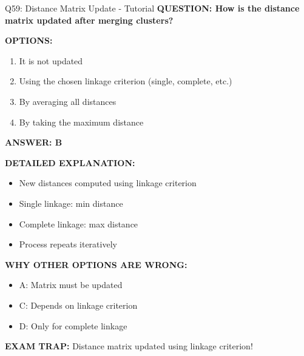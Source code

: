 \documentclass[8pt]{beamer}
\begin{document}
	\begin{frame}{Q59: Distance Matrix Update - Tutorial}
		\fontsize{6.5}{7.5}\selectfont
		\textbf{QUESTION: How is the distance matrix updated after merging clusters?}
		
		\vspace{0.1cm}
		\textbf{OPTIONS:}
		\begin{enumerate}
			\item It is not updated
			\item Using the chosen linkage criterion (single, complete, etc.)
			\item By averaging all distances
			\item By taking the maximum distance
		\end{enumerate}
		
		\vspace{0.1cm}
		\textcolor{myblue}{\textbf{ANSWER: B}}
		
		\vspace{0.1cm}
		\textbf{DETAILED EXPLANATION:}
		\begin{itemize}
			\item New distances computed using linkage criterion
			\item Single linkage: min distance
			\item Complete linkage: max distance
			\item Process repeats iteratively
		\end{itemize}
		
		\vspace{0.1cm}
		\textcolor{myred}{\textbf{WHY OTHER OPTIONS ARE WRONG:}}
		\begin{itemize}
			\item \textcolor{myred}{A:} Matrix must be updated
			\item \textcolor{myred}{C:} Depends on linkage criterion
			\item \textcolor{myred}{D:} Only for complete linkage
		\end{itemize}
		
		\textcolor{myred}{\textbf{EXAM TRAP:}} Distance matrix updated using \textcolor{myblue}{linkage criterion}!
	\end{frame}
	
\end{document}
